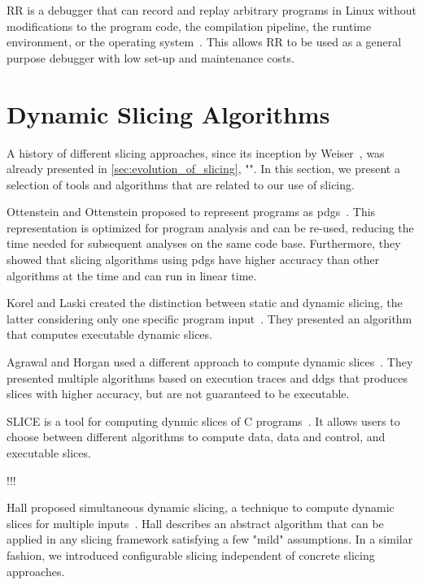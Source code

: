 RR is a debugger that can record and replay arbitrary programs in Linux without modifications to the program code, the compilation pipeline, the runtime environment, or the operating system~\cite{ocallahan17:engineering_record_and_replay}.
This allows RR to be used as a general purpose debugger with low set-up and maintenance costs.

\section{Dynamic Slicing Algorithms}
\label{sec:rw_dynamic_slicing}

A history of different slicing approaches, since its inception by Weiser~\cite{weiser81:program_slicing}, was already presented in \cref{sec:evolution_of_slicing}, "".
In this section, we present a selection of tools and algorithms that are related to our use of slicing.

Ottenstein and Ottenstein proposed to represent programs as \acfp{pdg}~\cite{ottenstein84:the_program_dependence_graph}.
This representation is optimized for program analysis and can be re-used, reducing the time needed for subsequent analyses on the same code base.
Furthermore, they showed that slicing algorithms using \acp{pdg} have higher accuracy than other algorithms at the time and can run in linear time.

Korel and Laski created the distinction between static and dynamic slicing, the latter considering only one specific program input~\cite{korel88:dynamic_program_slicing}.
They presented an algorithm that computes executable dynamic slices.

Agrawal and Horgan used a different approach to compute dynamic slices~\cite{agrawal90:dynamic_program_slicing}.
They presented multiple algorithms based on execution traces and \acfp{ddg} that produces slices with higher accuracy, but are not guaranteed to be executable.

SLICE is a tool for computing dynmic slices of C programs~\cite{venkatesh95:experimental_results_from_dynamic}.
It allows users to choose between different algorithms to compute data, data and control, and executable slices.

\cite{venkatesh91:the_semantic_approach}!!!

Hall proposed simultaneous dynamic slicing, a technique to compute dynamic slices for multiple inputs~\cite{hall95:automatic_extraction_of_executable}.
Hall describes an abstract algorithm that can be applied in any slicing framework satisfying a few "mild" assumptions.
In a similar fashion, we introduced configurable slicing independent of concrete slicing approaches.

